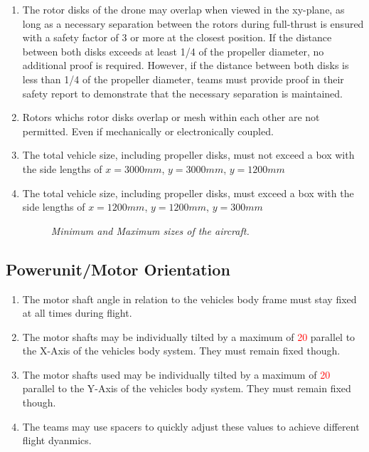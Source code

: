 \documentclass{article}
\begin{document}
\begin{enumerate}
  \item The rotor disks of the drone may overlap when viewed in the xy-plane, as long as a necessary separation between the rotors during full-thrust is ensured with a safety factor of 3 or more at the closest position. If the distance between both disks exceeds at least 1/4 of the propeller diameter, no additional proof is required. However, if the distance between both disks is less than 1/4 of the propeller diameter, teams must provide proof in their safety report to demonstrate that the necessary separation is maintained.  \item Rotors whichs rotor disks overlap or mesh within each other are not permitted. Even if mechanically or electronically coupled.
  \item The total vehicle size, including propeller disks, must not exceed a box with the side lengths of $x=3000mm$, $y=3000mm$, $y=1200mm$
  \item The total vehicle size, including propeller disks, must exceed a box with the side lengths of $x=1200mm$, $y=1200mm$, $y=300mm$

  \begin{figure}[h!]
    \centering
    \caption{\textit{Minimum and Maximum sizes of the aircraft.}}
  \end{figure}
    
\end{enumerate}

\subsection{Powerunit/Motor Orientation}
\begin{enumerate}
  \item The motor shaft angle in relation to the vehicles body frame must stay fixed at all times during flight. 
  \item The motor shafts may be individually tilted by a maximum of \textcolor{red}{20\degree} parallel to the X-Axis of the vehicles body system. They must remain fixed though.
  \item The motor shafts used may be individually tilted by a maximum of \textcolor{red}{20\degree}  parallel to the Y-Axis of the vehicles body system. They must remain fixed though.
  \item The teams may use spacers to quickly adjust these values to achieve different flight dyanmics.
\end{enumerate}
\end{document}

